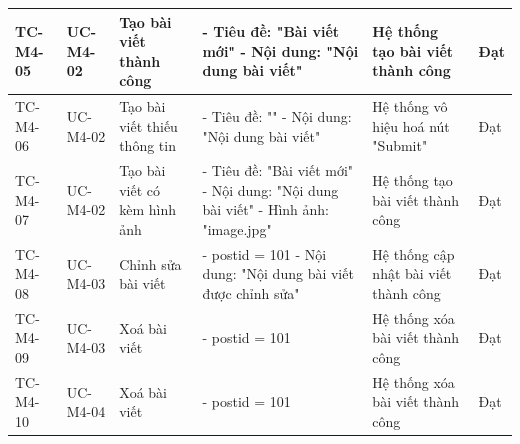 \begin{landscape}
\begin{longtable}{|p{2.2cm}|p{2.2cm}|p{4cm}|p{4.5cm}|p{6cm}|p{2cm}|}
TC-M4-05 & UC-M4-02 & Tạo bài viết thành công & 
- Tiêu đề: "Bài viết mới" \newline 
- Nội dung: "Nội dung bài viết" & 
Hệ thống tạo bài viết thành công & Đạt \\
\hline

TC-M4-06 & UC-M4-02 & Tạo bài viết thiếu thông tin & 
- Tiêu đề: "" \newline 
- Nội dung: "Nội dung bài viết" & 
Hệ thống vô hiệu hoá nút "Submit" & Đạt \\
\hline

TC-M4-07 & UC-M4-02 & Tạo bài viết có kèm hình ảnh & 
- Tiêu đề: "Bài viết mới" \newline 
- Nội dung: "Nội dung bài viết" 
- Hình ảnh: "image.jpg" & 
Hệ thống tạo bài viết thành công & Đạt \\
\hline

TC-M4-08 & UC-M4-03 & Chỉnh sửa bài viết & 
- postid = 101 \newline
- Nội dung: "Nội dung bài viết được chỉnh sửa" & 
Hệ thống cập nhật bài viết thành công & Đạt \\
\hline

TC-M4-09 & UC-M4-03 & Xoá bài viết & 
- postid = 101 & 
Hệ thống xóa bài viết thành công & Đạt \\
\hline

TC-M4-10 & UC-M4-04 & Xoá bài viết & 
- postid = 101 & 
Hệ thống xóa bài viết thành công & Đạt \\
\hline


\end{longtable}
\end{landscape}
